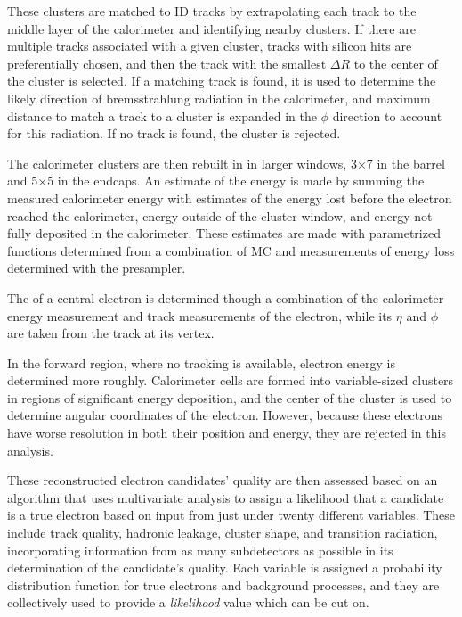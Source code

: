 These clusters are matched to \ac{ID} tracks by extrapolating each track to the middle layer of the calorimeter and identifying nearby clusters. If there are multiple tracks associated with a given cluster, tracks with silicon hits are preferentially chosen, and then the track with the smallest $\Delta R$ to the center of the cluster is selected. If a matching track is found, it is used to determine the likely direction of bremsstrahlung radiation in the calorimeter, and maximum distance to match a track to a cluster is expanded in the $\phi$ direction to account for this radiation. If no track is found, the cluster is rejected. 

The calorimeter clusters are then rebuilt in in larger windows, 3$\times$7 in the barrel and 5$\times$5 in the endcaps. An estimate of the energy is made by summing the measured calorimeter energy with estimates of the energy lost before the electron reached the calorimeter, energy outside of the cluster window, and energy not fully deposited in the calorimeter. These estimates are made with parametrized functions determined from a combination of \ac{MC} and measurements of energy loss determined with the presampler. 

The \pt of a central electron is determined though a combination of the calorimeter energy measurement and track measurements of the electron, while its $\eta$ and $\phi$ are taken from the track at its vertex. 

In the forward region, where no tracking is available, electron energy is determined more roughly. Calorimeter cells are formed into variable-sized clusters in regions of significant energy deposition, and the center of the cluster is used to determine angular coordinates of the electron. However, because these electrons have worse resolution in both their position and energy, they are rejected in this analysis. 

These reconstructed electron candidates' quality are then assessed based on an algorithm that uses multivariate analysis to assign a likelihood that a candidate is a true electron based on input from just under twenty different variables. These include track quality, hadronic leakage, cluster shape, and transition radiation, incorporating information from as many subdetectors as possible in its determination of the candidate's quality. Each variable is assigned a probability distribution function for true electrons and background processes, and they are collectively used to provide a \textit{likelihood} value which can be cut on. 

